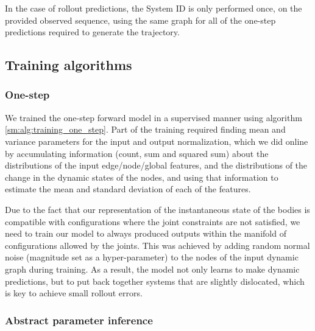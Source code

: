In the case of rollout predictions, the System ID is only performed once, on the provided observed sequence, using the same graph for all of the one-step predictions required to generate the trajectory.

\subsection{Training algorithms}
\label{sm:sec:training}

\subsubsection{One-step}
\label{sm:sec:training_one_step}


We trained the one-step forward model in a supervised manner using algorithm \ref{sm:alg:training_one_step}. Part of the training required finding mean and variance parameters for the input and output normalization, which we did online by accumulating information (count, sum and squared sum) about the distributions of the input edge/node/global features, and the distributions of the change in the dynamic states of the nodes, and using that information to estimate the mean and standard deviation of each of the features.

Due to the fact that our representation of the instantaneous state of the bodies is compatible with configurations where the joint constraints are not satisfied, we need to train our model to always produced outputs within the manifold of configurations allowed by the joints. This was achieved by adding random normal noise (magnitude set as a hyper-parameter) to the nodes of the input dynamic graph during training. As a result, the model not only learns to make dynamic predictions, but to put back together systems that are slightly dislocated, which is key to achieve small rollout errors.


\subsubsection{Abstract parameter inference}
\label{sm:sec:training_inference}

